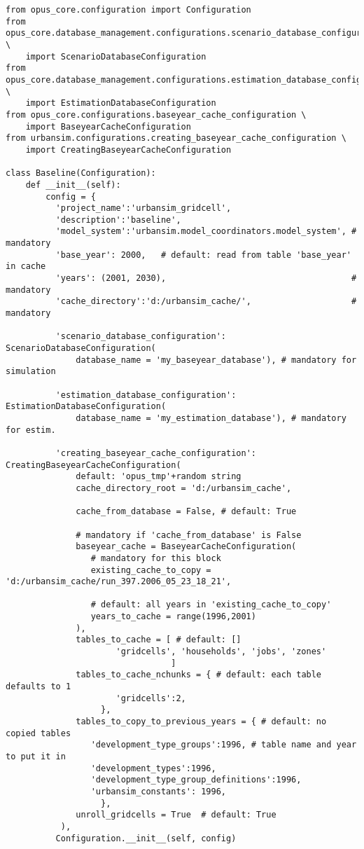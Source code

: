 \begin{verbatim}
from opus_core.configuration import Configuration
from opus_core.database_management.configurations.scenario_database_configuration \
    import ScenarioDatabaseConfiguration
from opus_core.database_management.configurations.estimation_database_configuration \
    import EstimationDatabaseConfiguration
from opus_core.configurations.baseyear_cache_configuration \
    import BaseyearCacheConfiguration
from urbansim.configurations.creating_baseyear_cache_configuration \
    import CreatingBaseyearCacheConfiguration
    
class Baseline(Configuration):
    def __init__(self):
        config = {
          'project_name':'urbansim_gridcell',
          'description':'baseline',  
          'model_system':'urbansim.model_coordinators.model_system', # mandatory
          'base_year': 2000,   # default: read from table 'base_year' in cache
          'years': (2001, 2030),                                     # mandatory
          'cache_directory':'d:/urbansim_cache/',                    # mandatory
          
          'scenario_database_configuration': ScenarioDatabaseConfiguration(
              database_name = 'my_baseyear_database'), # mandatory for simulation
              
          'estimation_database_configuration': EstimationDatabaseConfiguration(
              database_name = 'my_estimation_database'), # mandatory for estim.
              
          'creating_baseyear_cache_configuration': CreatingBaseyearCacheConfiguration(
              default: 'opus_tmp'+random string
              cache_directory_root = 'd:/urbansim_cache',
              
              cache_from_database = False, # default: True
              
              # mandatory if 'cache_from_database' is False
              baseyear_cache = BaseyearCacheConfiguration(
                 # mandatory for this block
                 existing_cache_to_copy = 'd:/urbansim_cache/run_397.2006_05_23_18_21',
            
                 # default: all years in 'existing_cache_to_copy'
                 years_to_cache = range(1996,2001)
              ),
              tables_to_cache = [ # default: []
                      'gridcells', 'households', 'jobs', 'zones'
                                 ]
              tables_to_cache_nchunks = { # default: each table defaults to 1
                      'gridcells':2,
                   },
              tables_to_copy_to_previous_years = { # default: no copied tables
                 'development_type_groups':1996, # table name and year to put it in
                 'development_types':1996,
                 'development_type_group_definitions':1996,
                 'urbansim_constants': 1996,
                   },
              unroll_gridcells = True  # default: True
           ),
          Configuration.__init__(self, config)
\end{verbatim}


